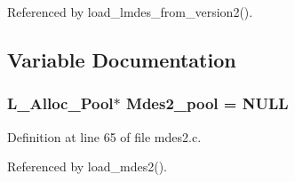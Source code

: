 Referenced by load\_\-lmdes\_\-from\_\-version2().

\subsection{Variable Documentation}
\subsubsection{\setlength{\rightskip}{0pt plus 5cm}\bf{L\_\-Alloc\_\-Pool}$\ast$ \bf{Mdes2\_\-pool} = \bf{NULL}\hspace{0.3cm}{\tt  [static]}}\label{mdes2_8c_a90162fb3a168d7427d56e6251c4c185}




Definition at line 65 of file mdes2.c.

Referenced by load\_\-mdes2().